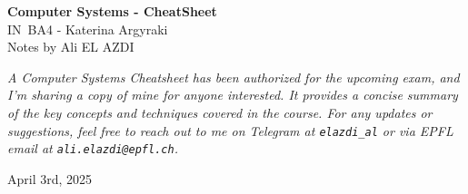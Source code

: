 \documentclass[8pt]{extarticle}
\begin{document}
\begin{titlepage}
    \centering
    \vspace*{1cm}
    {\fontsize{30}{36}\selectfont \textbf{Computer Systems - CheatSheet}} \\
    \vspace{10px}
    {\fontsize{15}{30}\selectfont IN~BA4 - Katerina Argyraki} \\
    \vspace*{10px}
    {\fontsize{15}{20}\selectfont Notes by Ali EL AZDI} \\
    \vfill

    \begin{justify}
        \textit{\large A Computer Systems Cheatsheet has been authorized for the upcoming exam, and I'm sharing a copy of mine for anyone interested. It provides a concise summary of the key concepts and techniques covered in the course. For any updates or suggestions, feel free to reach out to me on Telegram at \texttt{elazdi\_al} or via EPFL email at \texttt{ali.elazdi@epfl.ch}.}
    \end{justify}
    \vspace*{100px}

    {\Large April 3rd, 2025}
    \vspace*{50px}
\end{titlepage}
\vspace*{-10px}
\hspace*{-20px}
\end{document}

